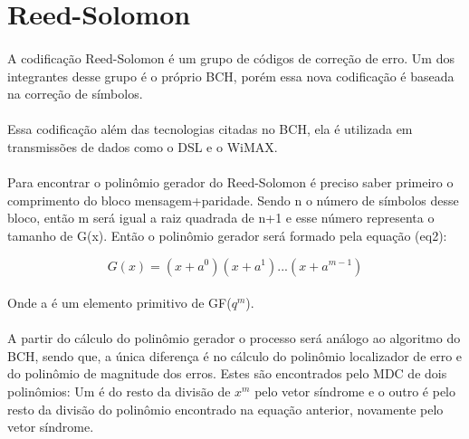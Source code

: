 \section{Reed-Solomon}
\paragraph{} A codificação Reed-Solomon é um grupo de códigos de correção de erro. Um dos integrantes desse grupo é o próprio BCH, porém essa nova codificação é baseada na correção de símbolos. 

\paragraph{}Essa codificação além das tecnologias citadas no BCH, ela é utilizada em transmissões de dados como o DSL e o WiMAX.

\paragraph{} Para encontrar o polinômio gerador do Reed-Solomon é preciso saber primeiro o comprimento do bloco mensagem+paridade. Sendo n o número de símbolos desse bloco, então m será igual a raiz quadrada de n+1 e esse número representa o tamanho de G(x). Então o polinômio gerador será formado pela equação (eq2):

\begin{equation}
\label{eq2}    
G(x) = (x + a^0)(x + a^1)...(x + a^{m-1})
\end{equation}

\paragraph{} Onde a é um elemento primitivo de GF($q^m$).

\paragraph{} A partir do cálculo do polinômio gerador o processo será análogo ao algoritmo do BCH, sendo que, a única diferença é no cálculo do polinômio localizador de erro e do polinômio de magnitude dos erros. Estes são encontrados pelo MDC de dois polinômios: Um é do resto da divisão de $x^m$ pelo vetor síndrome e o outro é pelo resto da divisão do polinômio encontrado na equação anterior, novamente pelo vetor síndrome. 
